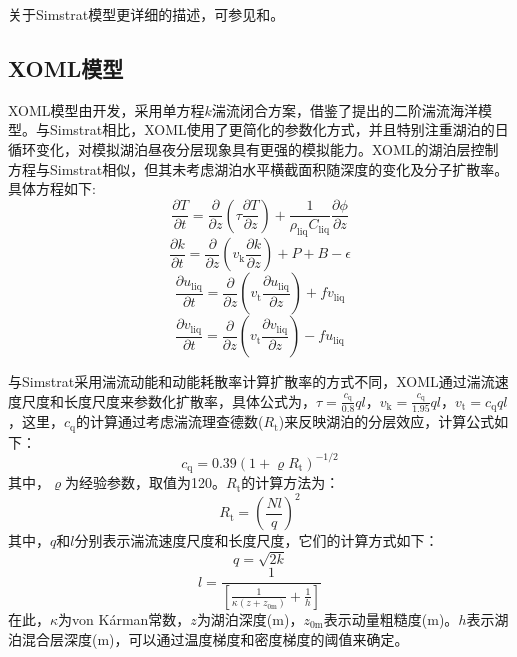 关于Simstrat模型更详细的描述，可参见\citet{goudsmit2002application}和\citet{gaudardOptimizingParameterizationDeep2017}。

\subsection{XOML模型}\label{XOML模型}
\label{XOML Model}

XOML模型由\citet{ling2015multilevel}开发，采用单方程$k$湍流闭合方案，借鉴了\citet{noh2002simulation,noh2011prediction}提出的二阶湍流海洋模型。与Simstrat相比，XOML使用了更简化的参数化方式，并且特别注重湖泊的日循环变化，对模拟湖泊昼夜分层现象具有更强的模拟能力。XOML的湖泊层控制方程与Simstrat相似，但其未考虑湖泊水平横截面积随深度的变化及分子扩散率。具体方程如下:
\begin{equation}
    \frac{\partial T}{\partial t} = \frac{\partial}{\partial z} \left( \tau \frac{\partial T}{\partial z} \right) + \frac{1}{\rho_{\mathrm{liq}} C_{\mathrm{liq}}} \frac{\partial \phi}{\partial z}
\end{equation}
\begin{equation}
    \frac{\partial k}{\partial t} = \frac{\partial}{\partial z} \left( v_{\mathrm{k}} \frac{\partial k}{\partial z} \right) + P + B - \epsilon
\end{equation}
\begin{equation}
    \frac{\partial u_{\mathrm{liq}}}{\partial t} = \frac{\partial}{\partial z} \left( v_{\mathrm{t}} \frac{\partial u_{\mathrm{liq}}}{\partial z} \right) + f v_{\mathrm{liq}}
\end{equation}
\begin{equation}
    \frac{\partial v_{\mathrm{liq}}}{\partial t} = \frac{\partial}{\partial z} \left( v_{\mathrm{t}} \frac{\partial v_{\mathrm{liq}}}{\partial z} \right) - f u_{\mathrm{liq}}
\end{equation}

与Simstrat采用湍流动能和动能耗散率计算扩散率的方式不同，XOML通过湍流速度尺度和长度尺度来参数化扩散率，具体公式为，$\tau = \frac{c_{\mathrm{q}}}{0.8} q l$，$v_{\mathrm{k}} = \frac{c_{\mathrm{q}}}{1.95} q l$，$v_{\mathrm{t}} = c_{\mathrm{q}} q l$，这里，$c_{\mathrm{q}}$的计算通过考虑湍流理查德数($R_{\mathrm{t}}$)来反映湖泊的分层效应，计算公式如下：
\begin{equation}
    c_{\mathrm{q}} = 0.39(1 + \varrho R_{\mathrm{t}})^{-1/2}
\end{equation}
其中，$\varrho$为经验参数，取值为120。$R_{\mathrm{t}}$的计算方法为：
\begin{equation}
    R_{\mathrm{t}} = \left( \frac{N l}{q} \right)^2
\end{equation}
其中，$q$和$l$分别表示湍流速度尺度和长度尺度，它们的计算方式如下：
\begin{equation}
    q = \sqrt{2k}
\end{equation}
\begin{equation}
    l = \frac{1}{\left[ \frac{1}{\kappa(z + z_{\mathrm{0m}})} + \frac{1}{h} \right]}
\end{equation}
在此，$\kappa$为von K\'arman常数，$z$为湖泊深度(\unit{m})，$z_{\mathrm{0m}}$表示动量粗糙度(\unit{m})。$h$表示湖泊混合层深度(\unit{m})，可以通过温度梯度和密度梯度的阈值来确定。

